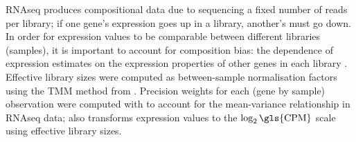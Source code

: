 %
\gls{RNAseq} produces compositional data due to sequencing a fixed number of reads per library; if one gene's expression goes up in a library, another's must go down.
In order for expression values to be comparable between different libraries (samples), it is important to account for composition bias: the dependence of expression estimates on the expression properties of other genes in each library \autocite{robinson2010ScalingNormalizationMethod}.
Effective library sizes were computed as between-sample normalisation factors using the \gls{TMM} method \autocite{robinson2010ScalingNormalizationMethod,evans2018SelectingBetweensampleRNASeq} from  \autocite{robinson2010EdgeRBioconductorPackage}.
%
Precision weights for each (gene by sample) observation were computed with  \autocite{law2014VoomPrecisionWeights} to account for the mean-variance relationship in \gls{RNAseq} data;
 also transforms expression values to the $\log_2{\text{\gls{CPM}}}$ scale using effective library sizes.

